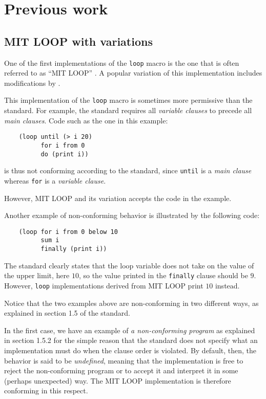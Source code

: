 \section{Previous work}

\subsection{MIT LOOP with variations}
\label{sec-mit-loop}

One of the first implementations of the \commonlisp{} \texttt{loop}
macro is the one that is often referred to as ``MIT LOOP''
\cite{Burke:Moon:MIT.loop}.  A popular variation of this
implementation includes modifications by \symbolics{}.

This implementation of the \texttt{loop} macro is sometimes more
permissive than the \commonlisp{} standard.  For example, the standard
requires all \emph{variable clauses} to precede all \emph{main
  clauses}.  Code such as the one in this example:

\begin{verbatim}
    (loop until (> i 20)
          for i from 0
          do (print i))
\end{verbatim}

\noindent
is thus not conforming according to the standard, since \texttt{until}
is a \emph{main clause} whereas \texttt{for} is a \emph{variable
  clause}.

However, MIT LOOP and its variation accepts the code in the example.

Another example of non-conforming behavior is illustrated by the
following code:

\begin{verbatim}
    (loop for i from 0 below 10
          sum i
          finally (print i))
\end{verbatim}

The \commonlisp{} standard clearly states that the loop variable does
not take on the value of the upper limit, here $10$, so the value
printed in the \texttt{finally} clause should be $9$.  However,
\texttt{loop} implementations derived from MIT LOOP print $10$
instead.

Notice that the two examples above are non-conforming in two different
ways, as explained in section 1.5 of the \commonlisp{} standard.

In the first case, we have an example of \emph{a non-conforming
  program} as explained in section 1.5.2 for the simple reason that
the standard does not specify what an implementation must do when the
clause order is violated.  By default, then, the behavior is said to
be \emph{undefined}, meaning that the implementation is free to reject
the non-conforming program or to accept it and interpret it in some
(perhaps unexpected) way.  The MIT LOOP implementation is therefore
conforming in this respect.

